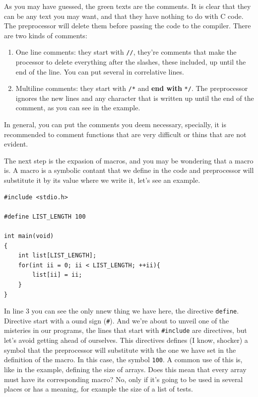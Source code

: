 \documentclass[a4paper]{article}
\begin{document}
As you may have guessed, the green texts are the comments. It is clear that they
can be any text you may want, and that they have nothing to do with C code.
The preprocessor will delete them before passing the code to the compiler.
There are two kinds of comments:
\begin{enumerate}
\item One line comments: they start with \verb!//!, they're comments that
make the processor to delete everything after the slashes, these included, up
until the end of the line. You can put several in correlative lines.
\item Multiline comments: they start with \verb!/*! and \textbf{end with}
\verb!*/!. The preprocessor ignores the new lines and any character that is
written up until the end of the comment, as you can see in the example.
\end{enumerate}

In general, you can put the comments you deem necessary, specially, it is
recommended to comment functions that are very difficult or thins that are not
evident.

The next step is the expasion of macros, and you may be wondering that a macro
is. A macro is a symbolic contant that we define in the code and preprocessor
will substitute it by its value where we write it, let's see an example.

\noindent
\begin{minipage}[H]{\linewidth}
\mbox{}
\begin{lstlisting}[style=C,
caption={Macro creation},
label={lst:defineDirective}]
#include <stdio.h>

#define LIST_LENGTH 100

int main(void)
{
    int list[LIST_LENGTH];
    for(int ii = 0; ii < LIST_LENGTH; ++ii){
        list[ii] = ii;
    }
}
\end{lstlisting}
\end{minipage}

In line 3 you can see the only nnew thing we have here, the directive
\verb!define!. Directive start with a ound sign (\verb!#!). And we're about to
unveil one of the misteries in our programs, the lines that start with
\verb!#include! are directives, but let's avoid getting ahead of ourselves.
This directives defines (I know, shocker) a symbol that the preprocessor will
substitute with the one we have set in the definition of the macro. In this
case, the symbol \verb"100". A common use of this is, like in the example,
defining the size of arrays. Does this mean that every array must have its
corresponding macro? No, only if it's going to be used in several places or has
a meaning, for example the size of a list of tests.
\end{document}
